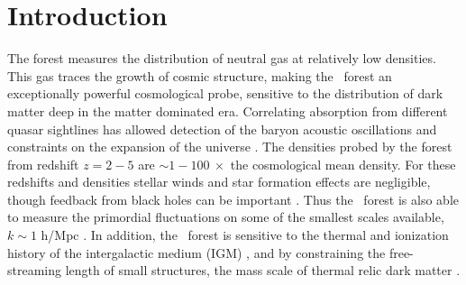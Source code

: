 \section{Introduction}\label{sec:intro}

The \lya forest \citep{1965ApJ...142.1633G, 1998ApJ...495...44C, 1998MNRAS.301..478T, 2000ApJ...543....1M, 2001ApJ...552...15H, 2002MNRAS.329..848V, 2006AJ....132..117F, 2006MNRAS.365..231V, 2006ApJS..163...80M} measures the distribution of neutral gas at relatively low densities. This gas traces the growth of cosmic structure, making the \lya~forest an exceptionally powerful cosmological probe, sensitive to the distribution of dark matter deep in the matter dominated era. Correlating absorption from different quasar sightlines has allowed detection of the baryon acoustic oscillations and constraints on the expansion of the universe \cite{2011JCAP...09..001S, 2013JCAP...04..026S, 2020ApJ...901..153D, 2022arXiv220913942C}.
The densities probed by the \lya forest from redshift $z=2-5$ are $\sim 1-100 \ \times$ the cosmological mean density.
For these redshifts and densities stellar winds and star formation effects are negligible, though feedback from black holes can be important \citep{2013MNRAS.429.1734V, 2020MNRAS.495.1825C}. Thus the \lya~forest is also able to measure the primordial fluctuations on some of the smallest scales available, $k \sim 1$ h/Mpc \citep{2004MNRAS.354..684V, 2005ApJ...635..761M, 2006MNRAS.370L..51V, 2005PhRvD..71j3515S, 2006JCAP...10..014S, 2017JCAP...06..047Y, 2020JCAP...04..038P, 2021JCAP...03..049G}. In addition, the \lya~forest is sensitive to the thermal and ionization history of the intergalactic medium (IGM) \citep{2008MNRAS.386.1131B,2014MNRAS.438.2499B, 2016MNRAS.463.2335N,2019ApJ...872...13W, 2019ApJ...872..101B, 2019MNRAS.490.3177W,2021MNRAS.506.4389G, 2022ApJ...933...59V}, and by constraining the free-streaming length of small structures, the mass scale of thermal relic dark matter \citep{2005PhRvD..71f3534V,  2013PhRvD..88d3502V, 2017PhRvD..96b3522I, 2020JCAP...04..038P, 2021MNRAS.502.2356G, 2021PhRvL.126g1302R, 2022arXiv220914220V}.


